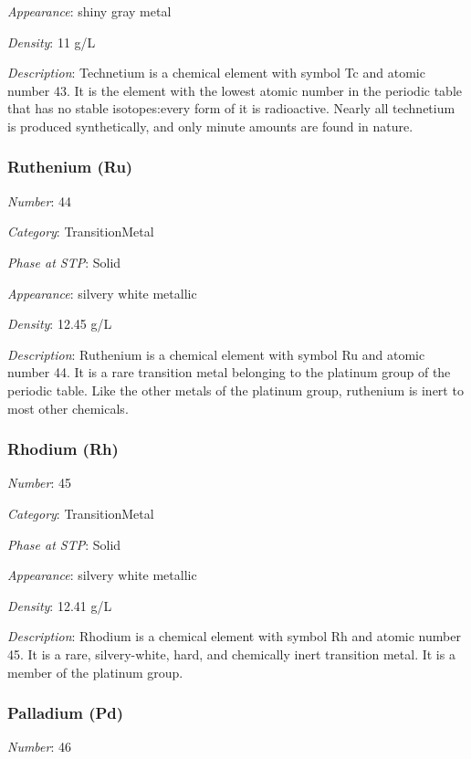 \documentclass{article}
\begin{document}
\textit{Appearance}: shiny gray metal

\textit{Density}: 11 g/L

\textit{Description}: Technetium is a chemical element with symbol Tc and atomic number 43. It is the element with the lowest atomic number in the periodic table that has no stable isotopes:every form of it is radioactive. Nearly all technetium is produced synthetically, and only minute amounts are found in nature.

\hypertarget{subsubsection::Ru}{}\subsubsection{Ruthenium (Ru)}

\textit{Number}: 44

\textit{Category}: TransitionMetal

\textit{Phase at STP}: Solid

\textit{Appearance}: silvery white metallic

\textit{Density}: 12.45 g/L

\textit{Description}: Ruthenium is a chemical element with symbol Ru and atomic number 44. It is a rare transition metal belonging to the platinum group of the periodic table. Like the other metals of the platinum group, ruthenium is inert to most other chemicals.

\hypertarget{subsubsection::Rh}{}\subsubsection{Rhodium (Rh)}

\textit{Number}: 45

\textit{Category}: TransitionMetal

\textit{Phase at STP}: Solid

\textit{Appearance}: silvery white metallic

\textit{Density}: 12.41 g/L

\textit{Description}: Rhodium is a chemical element with symbol Rh and atomic number 45. It is a rare, silvery-white, hard, and chemically inert transition metal. It is a member of the platinum group.

\hypertarget{subsubsection::Pd}{}\subsubsection{Palladium (Pd)}

\textit{Number}: 46
\end{document}

